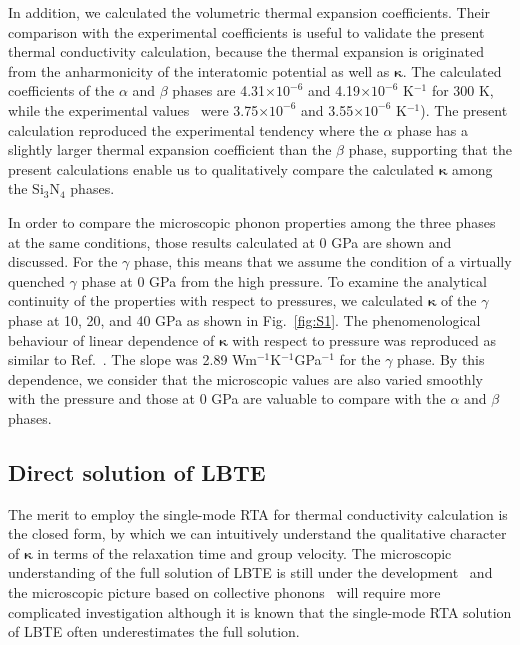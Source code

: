 \documentclass[twocolumn,amsmath,amssymb,a4paper,prb,superscriptaddress,floatfix]{revtex4-1}
\begin{document}
In addition, we calculated the volumetric thermal expansion coefficients. Their
comparison with the experimental coefficients is useful to validate the present
thermal conductivity calculation, because the thermal expansion is originated
from the anharmonicity of the interatomic potential as well as
$\boldsymbol{\kappa}$. The calculated coefficients of the $\alpha$ and $\beta$
phases are 4.31$\times 10^{-6}$ and 4.19$\times 10^{-6}$ K$^{-1}$ for 300 K,
while the experimental values~\cite{minikayev-alpha} were 3.75$\times 10^{-6}$
and 3.55$\times 10^{-6}$ K$^{-1}$). The present calculation reproduced the
experimental tendency where the $\alpha$ phase has a slightly larger thermal
expansion coefficient than the $\beta$ phase, supporting that the present
calculations enable us to qualitatively compare the calculated
$\boldsymbol{\kappa}$ among the Si$_3$N$_4$ phases.

In order to compare the microscopic phonon properties among the three phases at
the same conditions, those results calculated at 0 GPa are shown and discussed.
For the $\gamma$ phase, this means that we assume the condition of a virtually
quenched $\gamma$ phase at 0 GPa from the high pressure. To examine the
analytical continuity of the properties with respect to pressures, we
calculated $\boldsymbol{\kappa}$ of the $\gamma$ phase at 10, 20, and 40 GPa as
shown in Fig.~\ref{fig:S1}. The phenomenological behaviour of linear dependence
of $\boldsymbol{\kappa}$ with respect to pressure was reproduced as similar to
Ref.~. The slope was 2.89
Wm$^{-1}$K$^{-1}$GPa$^{-1}$ for the $\gamma$ phase.  By this dependence, we
consider that the microscopic values are also varied smoothly with the pressure
and those at 0 GPa are valuable to compare with the $\alpha$ and $\beta$
phases.

\subsection{Direct solution of LBTE}

The merit to employ the single-mode RTA for thermal conductivity calculation is
the closed form, by which we can intuitively understand the qualitative
character of $\boldsymbol{\kappa}$ in terms of the relaxation time and group velocity. The
microscopic understanding of the full solution of LBTE is still under the
development~\cite{cepellotti-relaxons} and the microscopic picture based on
collective phonons~\cite{hardy-collective} will require more complicated
investigation although it is known that the single-mode RTA solution of LBTE
often underestimates the full solution.~\cite{mukhopadhyay-ltc,ward-ltc}
\end{document}

